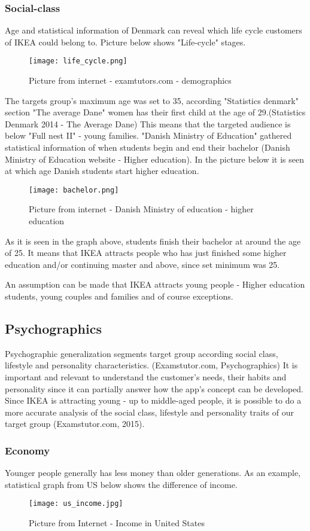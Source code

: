 \subsubsection{Social-class}
Age and statistical information of Denmark can reveal which life cycle customers of IKEA could belong to. Picture below shows "Life-cycle" stages.
\begin{figure}[H]
\centering
\texttt{[image: life\_cycle.png]}
\caption{Picture from internet -  examtutors.com - demographics}
\end{figure}
The targets group's maximum age was set to 35, according "Statistics denmark" section "The average Dane" women has their first child at the age of 29.(Statistics Denmark 2014 - The Average Dane) This means that the targeted audience is below "Full nest II" - young families. 
 "Danish Ministry of Education" gathered statistical information of when students begin and end their bachelor (Danish Ministry of Education website - Higher education). In the picture below it is seen at which age Danish students start higher education.
\begin{figure}[H]
\centering
\texttt{[image: bachelor.png]}
\caption{Picture from internet - Danish Ministry of education - higher education}
\end{figure}
As it is seen in the graph above, students finish their bachelor at around the age of 25. It means that IKEA attracts people who has just finished some higher education and/or continuing master and above, since set minimum was 25.

An assumption can be made that IKEA attracts young people - Higher education students, young couples and families and of course exceptions.

\subsection{Psychographics}
Psychographic generalization segments target group according social class, lifestyle and personality characteristics. (Examstutor.com, Psychographics) It is important and relevant to understand the customer's needs, their habits and personality since it can partially answer how the app's concept can be developed. 
Since IKEA is attracting young - up to middle-aged people, it is possible to do a more accurate analysis of the social class, lifestyle and personality traits of our target group (Examstutor.com,  2015). 
\subsubsection{Economy}
Younger people generally has less money than older generations. As an example, statistical graph from US below shows the difference of income.
\begin{figure}[H]
\centering
\texttt{[image: us\_income.jpg]}
\caption{Picture from Internet - Income in United States}
\end{figure}

